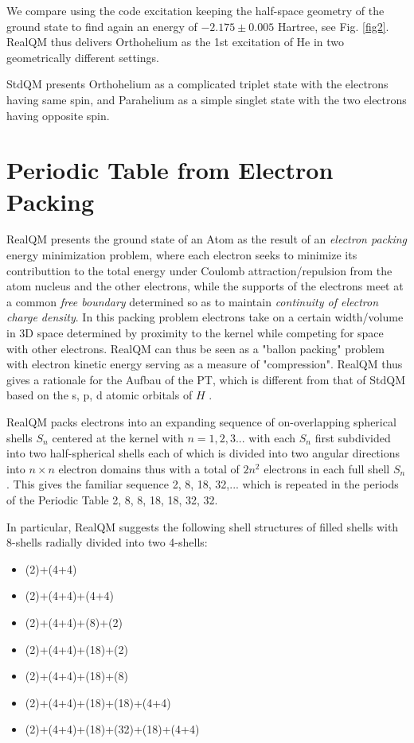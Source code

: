 \documentclass[11pt]{article} %
\begin{document}
We compare using the code \cite{code2} excitation keeping the half-space geometry of the ground state to find again an energy of $-2.175\pm 0.005$ Hartree,  see Fig. \ref{fig2}.  RealQM thus delivers Orthohelium as the 1st excitation of He in two geometrically different settings.  

StdQM presents Orthohelium as a complicated triplet state with the electrons having same spin,  and Parahelium as a simple singlet state with the two electrons having opposite spin.



\section{Periodic Table from Electron Packing}

RealQM presents the ground state of an Atom as the result of an \emph{electron packing} energy minimization problem,  where each electron seeks to minimize its contributtion to the total energy under Coulomb attraction/repulsion from the atom nucleus and the other electrons,  while the supports of the electrons meet at a common \emph{free boundary} determined so as to maintain \emph{continuity of electron charge density}.  In this packing problem electrons take on a certain width/volume in 3D space determined by proximity to the kernel while competing for space with other electrons.  RealQM can thus be seen as a "ballon packing" problem with electron kinetic energy serving as a measure of "compression".  RealQM thus gives a rationale for the Aufbau of the PT,  which is different from that of StdQM based on the s, p, d atomic orbitals of $H$ \cite{scerri1}.



RealQM packs electrons into an expanding sequence of on-overlapping spherical shells $S_n$ centered at the kernel with $n=1,2,3...$ with each $S_n$ first subdivided into two half-spherical shells each of which is divided into two angular directions into $n\times n$ electron domains thus with a total of $2n^2$ electrons in each full shell $S_n$.  This gives the familiar sequence 2,  8,  18,  32,... which is repeated in the periods of the Periodic Table 2,  8,  8,  18,  18,  32,  32.  

In particular,  RealQM suggests the following shell structures of filled shells with 8-shells radially divided into two 4-shells:
\begin{itemize}
\item (2)+(4+4)
\item (2)+(4+4)+(4+4) 
\item (2)+(4+4)+(8)+(2)
\item (2)+(4+4)+(18)+(2)
\item (2)+(4+4)+(18)+(8)
\item (2)+(4+4)+(18)+(18)+(4+4)
\item (2)+(4+4)+(18)+(32)+(18)+(4+4)
\end{itemize}
\end{document}
